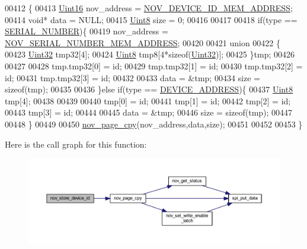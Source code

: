\begin{DoxyCode}
00412 \{
00413     \hyperlink{a00072_a59a9f6be4562c327cbfb4f7e8e18f08b}{Uint16}       nov\_address = \hyperlink{a00029_a3ddbe5b40319c96bfe46429e902f8d33}{NOV\_DEVICE\_ID\_MEM\_ADDRESS};
00414     \textcolor{keywordtype}{void}*        data = NULL;
00415     \hyperlink{a00072_af84840501dec18061d18a68c162a8fa2}{Uint8}        size = 0;
00416 
00417 
00418     \textcolor{keywordflow}{if}(type == \hyperlink{a00029_ad8a20d143f6a7579ed227578aeddec21}{SERIAL\_NUMBER})\{
00419     nov\_address = \hyperlink{a00029_ab7dc1ea8a7f6e16cf27fbfe88efd7285}{NOV\_SERIAL\_NUMBER\_MEM\_ADDRESS};
00420 
00421     \textcolor{keyword}{union}
00422     \{
00423         \hyperlink{a00072_aba99025e657f892beb7ff31cecf64653}{Uint32} tmp32[4];
00424         \hyperlink{a00072_af84840501dec18061d18a68c162a8fa2}{Uint8}  tmp8[4*\textcolor{keyword}{sizeof}(\hyperlink{a00072_aba99025e657f892beb7ff31cecf64653}{Uint32})];
00425     \}tmp;
00426 
00427 
00428     tmp.tmp32[0] = id;
00429     tmp.tmp32[1] = id;
00430     tmp.tmp32[2] = id;
00431     tmp.tmp32[3] = id;
00432     
00433     data = &tmp;
00434     size = \textcolor{keyword}{sizeof}(tmp);
00435 
00436     \}\textcolor{keywordflow}{else} \textcolor{keywordflow}{if}(type == \hyperlink{a00029_a457be1c5e5fee67ed7d01f5887c2d656}{DEVICE\_ADDRESS})\{
00437        \hyperlink{a00072_af84840501dec18061d18a68c162a8fa2}{Uint8}  tmp[4];
00438 
00439 
00440         tmp[0] = id;
00441         tmp[1] = id;
00442         tmp[2] = id;
00443         tmp[3] = id;
00444 
00445         data = &tmp;
00446         size = \textcolor{keyword}{sizeof}(tmp);
00447 
00448     \}
00449  
00450     \hyperlink{a00060_aeb021b0e002db120ad733c24f3e179bc}{nov\_page\_cpy}(nov\_address,data,size);
00451 
00452     
00453 \}
\end{DoxyCode}


Here is the call graph for this function\+:
\nopagebreak
\begin{figure}[H]
\begin{center}
\leavevmode
\includegraphics[width=350pt]{d9/d73/a00060_a9aa94b184db1bd55b6a4a61a34c14c8d_cgraph}
\end{center}
\end{figure}


